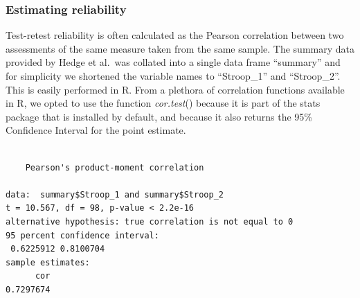 \documentclass[english,,man,floatsintext]{apa6}
\newenvironment{Shaded}{\begin{snugshade}}{\end{snugshade}}
\newcommand{\DecValTok}[1]{\textcolor[rgb]{0.00,0.00,0.81}{#1}}
\newcommand{\KeywordTok}[1]{\textcolor[rgb]{0.13,0.29,0.53}{\textbf{#1}}}
\newcommand{\NormalTok}[1]{#1}
\newcommand{\OperatorTok}[1]{\textcolor[rgb]{0.81,0.36,0.00}{\textbf{#1}}}
\begin{document}
\hypertarget{estimating-reliability}{%
\subsubsection{Estimating reliability}\label{estimating-reliability}}

Test-retest reliability is often calculated as the Pearson correlation between two assessments of the same measure taken from the same sample. The summary data provided by Hedge et al.~was collated into a single data frame \enquote{summary} and for simplicity we shortened the variable names to \enquote{Stroop\_1} and \enquote{Stroop\_2}. This is easily performed in R. From a plethora of correlation functions available in R, we opted to use the function \emph{cor.test}() because it is part of the stats package that is installed by default, and because it also returns the 95\% Confidence Interval for the point estimate.

\newpage

\begin{Shaded}
\end{Shaded}

\begin{verbatim}

    Pearson's product-moment correlation

data:  summary$Stroop_1 and summary$Stroop_2
t = 10.567, df = 98, p-value < 2.2e-16
alternative hypothesis: true correlation is not equal to 0
95 percent confidence interval:
 0.6225912 0.8100704
sample estimates:
      cor 
0.7297674 
\end{verbatim}
\end{document}
